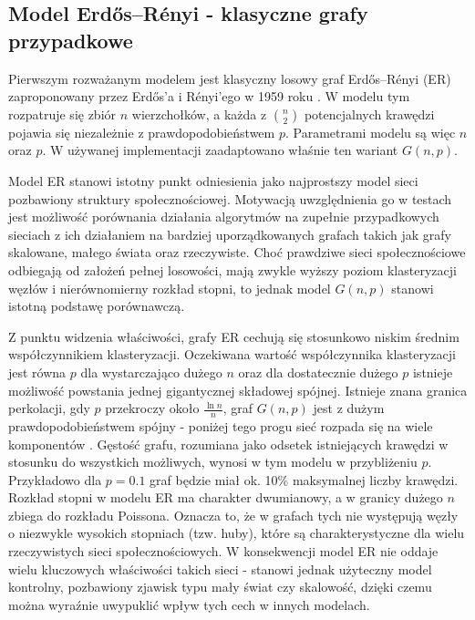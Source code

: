 \subsection{Model Erdős--Rényi - klasyczne grafy przypadkowe}
Pierwszym rozważanym modelem jest klasyczny losowy graf Erdős--Rényi (ER) zaproponowany przez Erd\H{o}s’a i Rényi’ego w 1959 roku \cite{ErdosRenyi1960}. W modelu tym rozpatruje się zbiór $n$ wierzchołków, a każda z $\binom{n}{2}$ potencjalnych krawędzi pojawia się niezależnie z prawdopodobieństwem $p$. Parametrami modelu są więc $n$ oraz $p$. W używanej implementacji zaadaptowano właśnie ten wariant $G(n,p)$.

Model ER stanowi istotny punkt odniesienia jako najprostszy model sieci pozbawiony struktury społecznościowej. Motywacją uwzględnienia go w testach jest możliwość porównania działania algorytmów na zupełnie przypadkowych sieciach z ich działaniem na bardziej uporządkowanych grafach takich jak grafy skalowane, małego świata oraz rzeczywiste. Choć prawdziwe sieci społecznościowe odbiegają od założeń pełnej losowości, mają zwykle wyższy poziom klasteryzacji węzłów i nierównomierny rozkład stopni, to jednak model $G(n, p)$ stanowi istotną podstawę porównawczą.

Z punktu widzenia właściwości, grafy ER cechują się stosunkowo niskim średnim współczynnikiem klasteryzacji. Oczekiwana wartość współczynnika klasteryzacji jest równa $p$ dla wystarczająco dużego $n$ oraz dla dostatecznie dużego $p$ istnieje możliwość powstania jednej gigantycznej składowej spójnej. Istnieje znana granica perkolacji, gdy $p$ przekroczy około $\frac{\ln n}{n}$, graf $G(n, p)$ jest z dużym prawdopodobieństwem spójny - poniżej tego progu sieć rozpada się na wiele komponentów \cite{ErdosRenyi1960}. Gęstość grafu, rozumiana jako odsetek istniejących krawędzi w stosunku do wszystkich możliwych, wynosi w tym modelu w przybliżeniu $p$. Przykładowo dla $p=0.1$ graf będzie miał ok. 10\% maksymalnej liczby krawędzi. Rozkład stopni w modelu ER ma charakter dwumianowy, a w granicy dużego $n$ zbiega do rozkładu Poissona. Oznacza to, że w grafach tych nie występują węzły o niezwykle wysokich stopniach (tzw. huby), które są charakterystyczne dla wielu rzeczywistych sieci społecznościowych. W konsekwencji model ER nie oddaje wielu kluczowych właściwości takich sieci - stanowi jednak użyteczny model kontrolny, pozbawiony zjawisk typu mały świat czy skalowość, dzięki czemu można wyraźnie uwypuklić wpływ tych cech w innych modelach.


